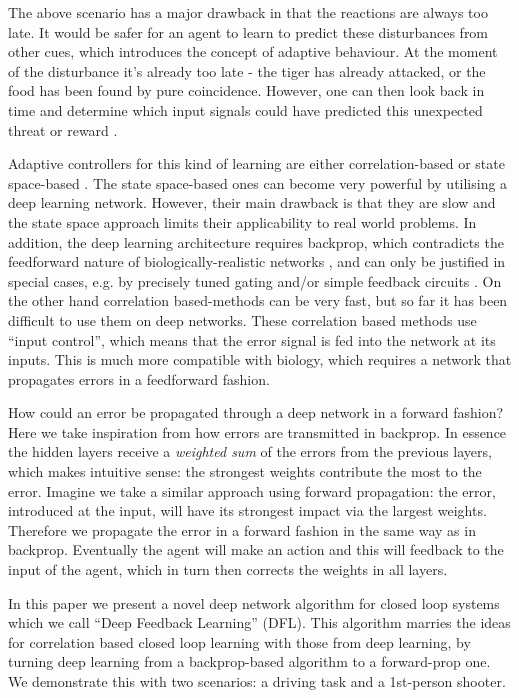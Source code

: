 \documentclass{aamas2017}
\begin{document}
The above scenario has a major drawback in that the reactions are always
too late.  It would be safer for an agent to learn to predict these
disturbances from other cues, which introduces the concept of adaptive behaviour. At the moment of the disturbance it's already too late - the
tiger has already attacked, or the food has been found by pure
coincidence. However, one can then look back in time and determine
which input signals could have predicted this unexpected
threat or reward \cite{Sutton98,Woergoetter2005,PorrNecoInvco2003}.

Adaptive controllers for this kind of learning are either
correlation-based \cite{PorrNecoISO2003,Verschure91} or state
space-based \cite{Dayan1992,Sutton98}. The state space-based ones can
become very powerful by utilising a deep learning network. However,
their main drawback is that they are slow and the state space approach
limits their applicability to real world problems. In addition, the
deep learning architecture requires backprop, which contradicts the
feedforward nature of biologically-realistic networks
\cite{Bennett2000}, and can only be justified in special cases,
e.g. by precisely tuned gating and/or simple feedback circuits
\cite{Lillicrap2016}. On the other hand correlation based-methods can
be very fast, but so far it has been difficult to use them on
deep networks.  These correlation based methods use ``input control'',
which means that the error signal is fed into the network at its
inputs. This is much more compatible with biology, which requires a
network that propagates errors in a feedforward fashion.

How could an error be propagated through a deep network in a forward
fashion? Here we take inspiration from how errors are transmitted
in backprop. In essence the hidden layers receive a \textsl{weighted
  sum} of the errors from the previous layers, which makes intuitive
sense: the strongest weights contribute the most to the error. Imagine
we take a similar approach using forward propagation: the error,
introduced at the input, will have its strongest impact via the
largest weights. Therefore we propagate the error in a forward fashion
in the same way as in backprop. Eventually the agent will make an
action and this will feedback to the input of the agent, which in turn
then corrects the weights in all layers.

In this paper we present a novel deep network algorithm for closed loop systems
which we call ``Deep Feedback Learning'' (DFL). This algorithm marries the
ideas for correlation based closed loop learning with those from deep learning,
by turning deep learning from a backprop-based algorithm to a forward-prop
one. We demonstrate this with two scenarios: a driving task and a 1st-person shooter.
\end{document}
